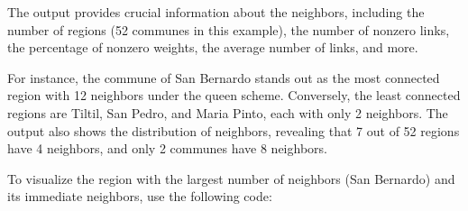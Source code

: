 The output provides crucial information about the neighbors, including the number of regions (52 communes in this example), the number of nonzero links, the percentage of nonzero weights, the average number of links, and more.

For instance, the commune of San Bernardo stands out as the most connected region with 12 neighbors under the queen scheme. Conversely, the least connected regions are Tiltil, San Pedro, and Maria Pinto, each with only 2 neighbors. The output also shows the distribution of neighbors, revealing that 7 out of 52 regions have 4 neighbors, and only 2 communes have 8 neighbors.

To visualize the region with the largest number of neighbors (San Bernardo) and its immediate neighbors, use the following code:
\begin{knitrout}
\color{fgcolor}\begin{kframe}
\begin{alltt}
 \hlkwb{<-} 
 \hlkwb{<-}  \hlopt{==} 
 \hlkwb{<-} \hldef{(}\hldef{,} 
 \hlkwb{<-} 
 \hlkwb{<-} 
\hldef{(}  
\end{alltt}
\end{kframe}
\end{knitrout}

